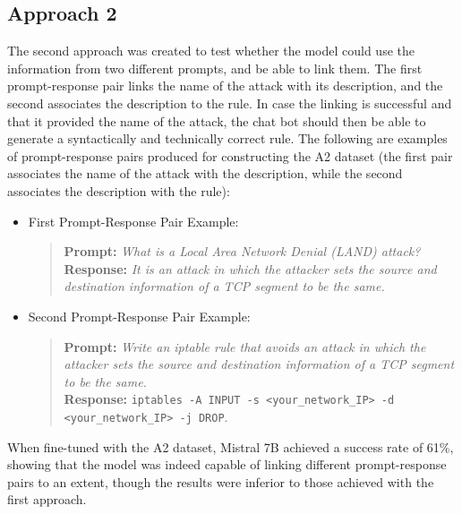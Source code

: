 \documentclass[sigconf]{acmart}
\begin{document}
\subsection{Approach 2}
The second approach was created to test whether the model could use the information from two different prompts, and be able to link them. The first prompt-response pair links the name of the attack with its description, and the second associates the description to the rule. In case the linking is successful and that it provided the name of the attack, the chat bot should then be able to generate a syntactically and technically correct rule. 
The following are examples of prompt-response pairs produced for constructing the A2 dataset (the first pair associates the name of the attack with the description, while the second associates the description with the rule):
\begin{itemize}
    \item First Prompt-Response Pair Example:
    \begin{quote}
        \textbf{Prompt:} \textit{What is a Local Area Network Denial (LAND) attack?} \\
        \textbf{Response:} \textit{It is an attack in which the attacker sets the source and destination information of a TCP segment to be the same.}
    \end{quote}
    \item Second Prompt-Response Pair Example:
    \begin{quote}
        \textbf{Prompt:} \textit{Write an iptable rule that avoids an attack in which the attacker sets the source and destination information of a TCP segment to be the same.} \\
        \textbf{Response:} \texttt{iptables -A INPUT -s <your\_network\_IP> -d <your\_network\_IP> -j DROP}.
    \end{quote}
\end{itemize}
When fine-tuned with the A2 dataset, Mistral 7B achieved a success rate of 61\%, showing that the model was indeed capable of linking different prompt-response pairs to an extent, though the results were inferior to those achieved with the first approach.
\end{document}
